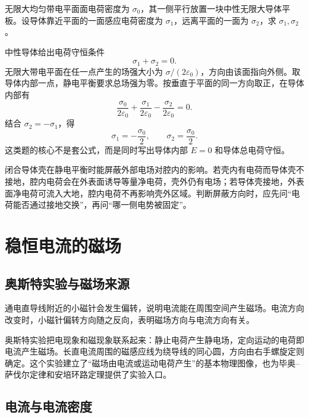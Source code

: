 \begin{example}[title={无限大带电平面旁放置中性导体平板}]\label{eg:conducting-slab}
无限大均匀带电平面面电荷密度为 $\sigma_0$，其一侧平行放置一块中性无限大导体平板。设导体靠近平面的一面感应电荷密度为 $\sigma_1$，远离平面的一面为 $\sigma_2$，求 $\sigma_1,\sigma_2$。
\begin{solution}
中性导体给出电荷守恒条件
\[
  \sigma_1+\sigma_2=0.
\]
无限大带电平面在任一点产生的场强大小为 $\sigma/(2\varepsilon_0)$，方向由该面指向外侧。取导体内部一点，静电平衡要求总场强为零。按垂直于平面的同一方向取正，在导体内部有
\[
  \frac{\sigma_0}{2\varepsilon_0}+\frac{\sigma_1}{2\varepsilon_0}
  -\frac{\sigma_2}{2\varepsilon_0}=0.
\]
结合 $\sigma_2=-\sigma_1$，得
\[
  \sigma_1=-\frac{\sigma_0}{2},\qquad
  \sigma_2=\frac{\sigma_0}{2}.
\]
这类题的核心不是套公式，而是同时写出导体内部 $E=0$ 和导体总电荷守恒。
\end{solution}
\end{example}

\begin{attention}[静电屏蔽的物理解释]
闭合导体壳在静电平衡时能屏蔽外部电场对腔内的影响。若壳内有电荷而导体壳不接地，腔内电荷会在外表面诱导等量净电荷，壳外仍有电场；若导体壳接地，外表面净电荷可流入大地，腔内电荷不再影响壳外区域。判断屏蔽方向时，应先问“电荷能否通过接地交换”，再问“哪一侧电势被固定”。
\end{attention}

\section{稳恒电流的磁场}

\subsection{奥斯特实验与磁场来源}

\begin{definition}[奥斯特实验的物理结论]\label{def:oersted-experiment}
通电直导线附近的小磁针会发生偏转，说明电流能在周围空间产生磁场。电流方向改变时，小磁针偏转方向随之反向，表明磁场方向与电流方向有关。
\end{definition}

奥斯特实验把电现象和磁现象联系起来：静止电荷产生静电场，定向运动的电荷即电流产生磁场。长直电流周围的磁感应线为绕导线的同心圆，方向由右手螺旋定则确定。这个实验建立了“磁场由电流或运动电荷产生”的基本物理图像，也为毕奥--萨伐尔定律和安培环路定理提供了实验入口。

\subsection{电流与电流密度}


